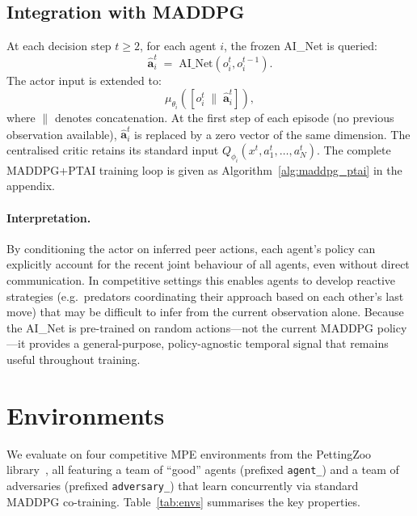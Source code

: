 \documentclass[12pt]{article}
\begin{document}
\subsection{Integration with MADDPG}

At each decision step $t \geq 2$, for each agent $i$, the frozen AI\_Net is queried:
\begin{equation}
\widehat{\mathbf{a}}^t_i \;=\; \text{AI\_Net}(o^t_i, o^{t-1}_i).
\end{equation}
The actor input is extended to:
\begin{equation}
\mu_{\theta_i}\!\left([o^t_i \;\|\; \widehat{\mathbf{a}}^t_i]\right),
\label{eq:actor_ptai}
\end{equation}
where $\|$ denotes concatenation. At the first step of each episode (no previous
observation available), $\widehat{\mathbf{a}}^t_i$ is replaced by a zero vector of the
same dimension. The centralised critic retains its standard input
$Q_{\phi_i}(x^t, a^t_1, \ldots, a^t_N)$. The complete MADDPG+PTAI training loop is
given as Algorithm~\ref{alg:maddpg_ptai} in the appendix.

\paragraph{Interpretation.}
By conditioning the actor on inferred peer actions, each agent's policy can explicitly
account for the recent joint behaviour of all agents, even without direct communication.
In competitive settings this enables agents to develop reactive strategies (e.g.\
predators coordinating their approach based on each other's last move) that may be difficult to infer from the current observation alone. Because the AI\_Net is pre-trained on
random actions---not the current MADDPG policy---it provides a general-purpose,
policy-agnostic temporal signal that remains useful throughout training.

\section{Environments}

We evaluate on four competitive MPE environments from the PettingZoo library~\cite{terry2021pettingzoo}, all featuring a team of ``good'' agents (prefixed \texttt{agent\_}) and a team of adversaries (prefixed \texttt{adversary\_}) that learn concurrently via standard MADDPG co-training. Table~\ref{tab:envs} summarises the key properties.
\end{document}
